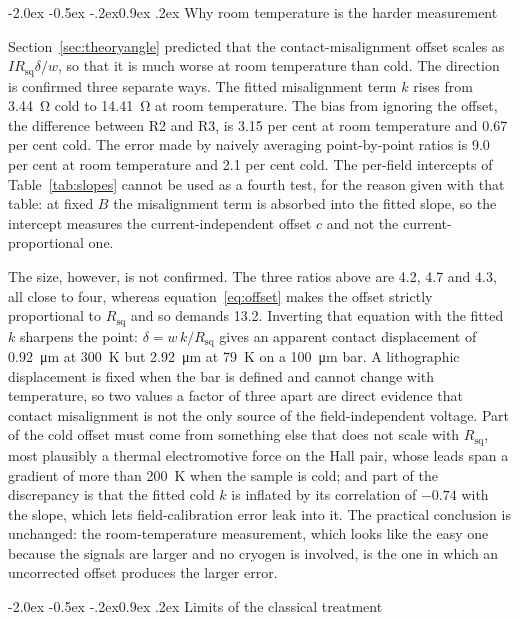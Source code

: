 \documentclass[11pt,a4paper]{article}
\makeatletter
\renewcommand\subsection{\@startsection{subsection}{2}{\z@}%
  {-2.0ex \@plus -0.5ex \@minus -.2ex}{0.9ex \@plus .2ex}%
  {\normalfont\normalsize\bfseries}}
\newcommand{\Rsq}{R_{\mathrm{sq}}}
\makeatother
\begin{document}
\subsection{Why room temperature is the harder measurement}
\label{sec:rtharder}

Section~\ref{sec:theoryangle} predicted that the contact-misalignment offset scales as
$I\Rsq\delta/w$, so that it is much worse at room temperature than cold. The direction is
confirmed three separate ways. The fitted misalignment term $k$ rises from \qty{3.44}{\ohm}
cold to \qty{14.41}{\ohm} at room temperature. The bias from ignoring the offset, the
difference between R2 and R3, is \num{3.15} per cent at room temperature and \num{0.67} per
cent cold. The error made by naively averaging point-by-point ratios is \num{9.0} per cent at
room temperature and \num{2.1} per cent cold. The per-field intercepts of
Table~\ref{tab:slopes} cannot be used as a fourth test, for the reason given with that table:
at fixed $B$ the misalignment term is absorbed into the fitted slope, so the intercept
measures the current-independent offset $c$ and not the current-proportional one.

The size, however, is not confirmed. The three ratios above are \num{4.2}, \num{4.7} and
\num{4.3}, all close to four, whereas equation~\eqref{eq:offset} makes the offset strictly
proportional to $\Rsq$ and so demands \num{13.2}. Inverting that equation with the fitted $k$
sharpens the point: $\delta = w\,k/\Rsq$ gives an apparent contact displacement of
\qty{0.92}{\micro\metre} at \qty{300}{\kelvin} but \qty{2.92}{\micro\metre} at
\qty{79}{\kelvin} on a \qty{100}{\micro\metre} bar. A lithographic displacement is fixed when
the bar is defined and cannot change with temperature, so two values a factor of three apart
are direct evidence that contact misalignment is not the only source of the field-independent
voltage. Part of the cold offset must come from something else that does not scale with
$\Rsq$, most plausibly a thermal electromotive force on the Hall pair, whose leads span a
gradient of more than \qty{200}{\kelvin} when the sample is cold; and part of the discrepancy
is that the fitted cold $k$ is inflated by its correlation of $-0.74$ with the slope, which
lets field-calibration error leak into it. The practical conclusion is unchanged: the
room-temperature measurement, which looks like the easy one because the signals are larger and
no cryogen is involved, is the one in which an uncorrected offset produces the larger error.

\subsection{Limits of the classical treatment}
\end{document}
